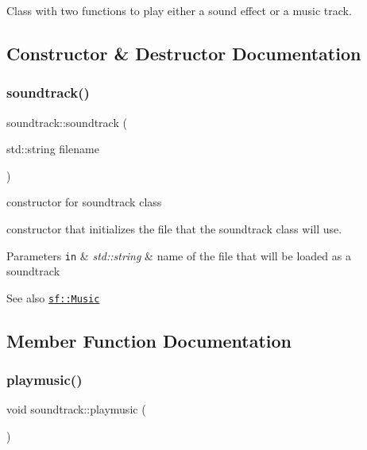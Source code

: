Class with two functions to play either a sound effect or a music track. 

\subsection{Constructor \& Destructor Documentation}
\mbox{\label{classsoundtrack_add31bdeb1a693d541443f1d88586d3b6}} 
\subsubsection{\texorpdfstring{soundtrack()}{soundtrack()}}
{\footnotesize\ttfamily soundtrack\+::soundtrack (\begin{DoxyParamCaption}\item[{std\+::string}]{filename }\end{DoxyParamCaption})}



constructor for soundtrack class 

constructor that initializes the file that the soundtrack class will use.


\begin{DoxyParams}[1]{Parameters}
\mbox{\tt in}  & {\em std\+::string} & name of the file that will be loaded as a soundtrack\\
\hline
\end{DoxyParams}
\begin{DoxySeeAlso}{See also}
\href{http://www.sfml-dev.org/documentation/2.0/classsf_1_1Music.php}{\tt sf\+::\+Music} 
\end{DoxySeeAlso}


\subsection{Member Function Documentation}
\mbox{\label{classsoundtrack_a7569a4c0cde86548197756b8e05cf464}} 
\subsubsection{\texorpdfstring{playmusic()}{playmusic()}}
{\footnotesize\ttfamily void soundtrack\+::playmusic (\begin{DoxyParamCaption}{ }\end{DoxyParamCaption})}



